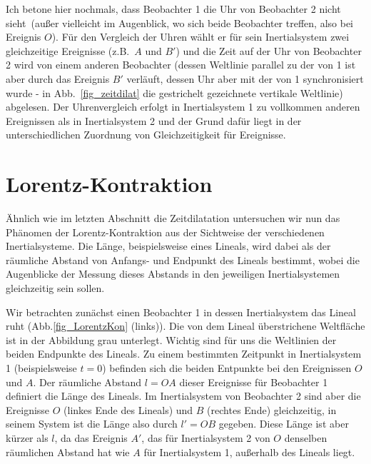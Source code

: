 Ich betone hier nochmals, dass Beobachter 1
die Uhr von Beobachter 2 nicht \glqq sieht\grqq\
(au\ss er vielleicht im Augenblick, wo sich 
beide Beobachter treffen, also bei Ereignis
$O$). F\"ur den Vergleich der Uhren
w\"ahlt er f\"ur sein Inertialsystem zwei
gleichzeitige Ereignisse (z.B.\ $A$ und $B'$)
und die Zeit auf der Uhr von Beobachter 2
wird von einem anderen Beobachter
(dessen Weltlinie parallel zu der von 1 ist
aber durch das Ereignis $B'$ verl\"auft, dessen
Uhr aber mit der von 1 synchronisiert wurde - in Abb.\ \ref{fig_zeitdilat} 
die gestrichelt gezeichnete vertikale Weltlinie)
abgelesen. Der Uhrenvergleich erfolgt
in Inertialsystem 1 zu vollkommen anderen
Ereignissen als in Inertialsystem 2 und
der Grund daf\"ur liegt in der 
unterschiedlichen Zuordnung von
Gleichzeitigkeit f\"ur Ereignisse.

\section{Lorentz-Kontraktion}

\"Ahnlich wie im letzten Abschnitt
die Zeitdilatation untersuchen wir nun
das Ph\"anomen der Lorentz-Kontraktion
aus der Sichtweise der verschiedenen
Inertialsysteme. Die L\"ange, beispielsweise eines 
Lineals, wird dabei als der
r\"aumliche Abstand von Anfangs- und
Endpunkt des Lineals bestimmt, wobei die
Augenblicke der Messung dieses Abstands in den
jeweiligen Inertialsystemen gleichzeitig
sein sollen.

Wir betrachten zun\"achst einen 
Beobachter 1 in dessen Inertialsystem
das Lineal ruht (Abb.\ref{fig_LorentzKon} (links)). 
Die von dem Lineal \"uberstrichene Weltfl\"ache
ist in der Abbildung grau unterlegt. Wichtig
sind f\"ur uns die Weltlinien der beiden
Endpunkte des Lineals. Zu einem bestimmten
Zeitpunkt in Inertialsystem 1 (beispielsweise
$t=0$) befinden sich die beiden Entpunkte
bei den Ereignissen $O$ und $A$. Der
r\"aumliche Abstand $l=OA$ dieser Ereignisse f\"ur
Beobachter 1 definiert die L\"ange des
Lineals. Im Inertialsystem von Beobachter 2
sind aber die Ereignisse $O$ (linkes Ende
des Lineals) und $B$ (rechtes Ende) 
gleichzeitig, in seinem System ist die
L\"ange also durch $l'=OB$ gegeben. 
Diese L\"ange ist aber k\"urzer als $l$,
da das Ereignis $A'$, das f\"ur Inertialsystem 2
von $O$ denselben r\"aumlichen Abstand 
hat wie $A$ f\"ur Inertialsystem 1, au\ss erhalb
des Lineals liegt. 

